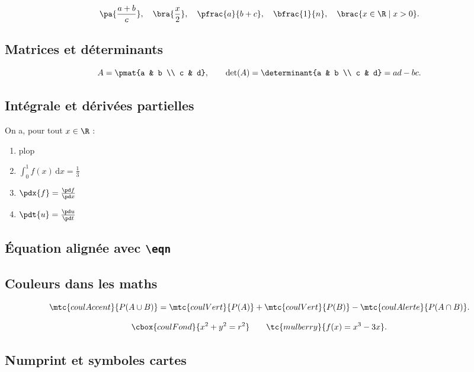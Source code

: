 \[
	\pa{\frac{a+b}{c}}, \quad
	\bra{\frac{x}{2}}, \quad
	\pfrac{a}{b+c}, \quad
	\bfrac{1}{n}, \quad
	\brac{x \in \R \mid x > 0}.
\]

\subsection{Matrices et déterminants}

\[
	A = \pmat{a & b \\ c & d}, \qquad
	\det(A) = \determinant{a & b \\ c & d} = ad - bc.
\]

\subsection{Intégrale et dérivées partielles}

On a, pour tout $x\in\R$ :

\begin{enumerate}
	\item plop
	\item $\int_0^1 f(x)\,\mathrm{d}x = \frac{1}{3}$
	\item $\pdx{f} = \frac{\pd f}{\pd x}$
	\item $\pdt{u} = \frac{\pd u}{\pd t}$
\end{enumerate}

\subsection{Équation alignée avec \texttt{\textbackslash eqn}}


\subsection{Couleurs dans les maths}

\[
	\mtc{coulAccent}{P(A \cup B)} = \mtc{coulVert}{P(A)} +
	\mtc{coulVert}{P(B)} - \mtc{coulAlerte}{P(A \cap B)}.
\]

\[
	\cbox{coulFond}{x^2 + y^2 = r^2} \qquad
	\tc{mulberry}{f(x) = x^3 - 3x}.
\]

\subsection{Numprint et symboles cartes}

